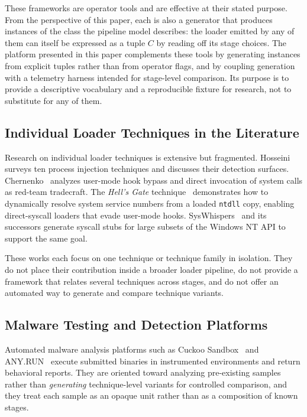 These frameworks are operator tools and are effective at their stated purpose.
From the perspective of this paper, each is also a generator that produces instances of the class the pipeline model describes: the loader emitted by any of them can itself be expressed as a tuple $C$ by reading off its stage choices.
The platform presented in this paper complements these tools by generating instances from explicit tuples rather than from operator flags, and by coupling generation with a telemetry harness intended for stage-level comparison.
Its purpose is to provide a descriptive vocabulary and a reproducible fixture for research, not to substitute for any of them.

\subsection{Individual Loader Techniques in the Literature}

Research on individual loader techniques is extensive but fragmented.
Hosseini~\cite{process_injection} surveys ten process injection techniques and discusses their detection surfaces.
Chernenko~\cite{api_unhooking} analyzes user-mode hook bypass and direct invocation of system calls as red-team tradecraft.
The \textit{Hell's Gate} technique~\cite{hellsgate} demonstrates how to dynamically resolve system service numbers from a loaded \texttt{ntdll} copy, enabling direct-syscall loaders that evade user-mode hooks.
SysWhispers~\cite{syswhispers} and its successors generate syscall stubs for large subsets of the Windows NT API to support the same goal.

These works each focus on one technique or technique family in isolation.
They do not place their contribution inside a broader loader pipeline, do not provide a framework that relates several techniques across stages, and do not offer an automated way to generate and compare technique variants.

\subsection{Malware Testing and Detection Platforms}

Automated malware analysis platforms such as Cuckoo Sandbox~\cite{cuckoo} and ANY.RUN~\cite{anyrun} execute submitted binaries in instrumented environments and return behavioral reports.
They are oriented toward analyzing pre-existing samples rather than \emph{generating} technique-level variants for controlled comparison, and they treat each sample as an opaque unit rather than as a composition of known stages.

